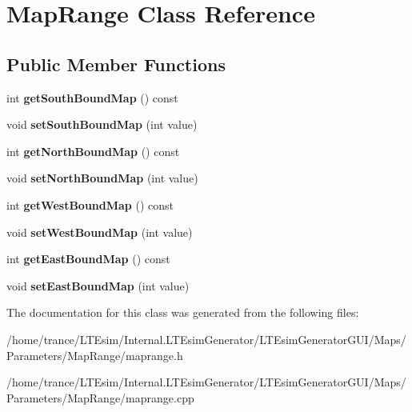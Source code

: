 \hypertarget{class_map_range}{}\section{Map\+Range Class Reference}
\label{class_map_range}
\subsection*{Public Member Functions}
\begin{DoxyCompactItemize}
\item 
int {\bfseries get\+South\+Bound\+Map} () const \hypertarget{class_map_range_a590351f0d5e00c325a76d8fb1c818159}{}\label{class_map_range_a590351f0d5e00c325a76d8fb1c818159}

\item 
void {\bfseries set\+South\+Bound\+Map} (int value)\hypertarget{class_map_range_af4105875849a94f96efd3b54e5ea1eff}{}\label{class_map_range_af4105875849a94f96efd3b54e5ea1eff}

\item 
int {\bfseries get\+North\+Bound\+Map} () const \hypertarget{class_map_range_a4de2275ffc7f9ce867906b5742895121}{}\label{class_map_range_a4de2275ffc7f9ce867906b5742895121}

\item 
void {\bfseries set\+North\+Bound\+Map} (int value)\hypertarget{class_map_range_ab628f0907f94c6cd430d658426b89bb7}{}\label{class_map_range_ab628f0907f94c6cd430d658426b89bb7}

\item 
int {\bfseries get\+West\+Bound\+Map} () const \hypertarget{class_map_range_ae7b0ccbc1850744fd2cc35f8aef9e9a4}{}\label{class_map_range_ae7b0ccbc1850744fd2cc35f8aef9e9a4}

\item 
void {\bfseries set\+West\+Bound\+Map} (int value)\hypertarget{class_map_range_a8bc5289f6c588e9ac6364f714025206c}{}\label{class_map_range_a8bc5289f6c588e9ac6364f714025206c}

\item 
int {\bfseries get\+East\+Bound\+Map} () const \hypertarget{class_map_range_a74e93c93ce3171ae2405df2cef42637a}{}\label{class_map_range_a74e93c93ce3171ae2405df2cef42637a}

\item 
void {\bfseries set\+East\+Bound\+Map} (int value)\hypertarget{class_map_range_a8971b5b5842bcfecd21098318aba78ab}{}\label{class_map_range_a8971b5b5842bcfecd21098318aba78ab}

\end{DoxyCompactItemize}


The documentation for this class was generated from the following files\+:\begin{DoxyCompactItemize}
\item 
/home/trance/\+L\+T\+Esim/\+Internal.\+L\+T\+Esim\+Generator/\+L\+T\+Esim\+Generator\+G\+U\+I/\+Maps/\+Parameters/\+Map\+Range/maprange.\+h\item 
/home/trance/\+L\+T\+Esim/\+Internal.\+L\+T\+Esim\+Generator/\+L\+T\+Esim\+Generator\+G\+U\+I/\+Maps/\+Parameters/\+Map\+Range/maprange.\+cpp\end{DoxyCompactItemize}
